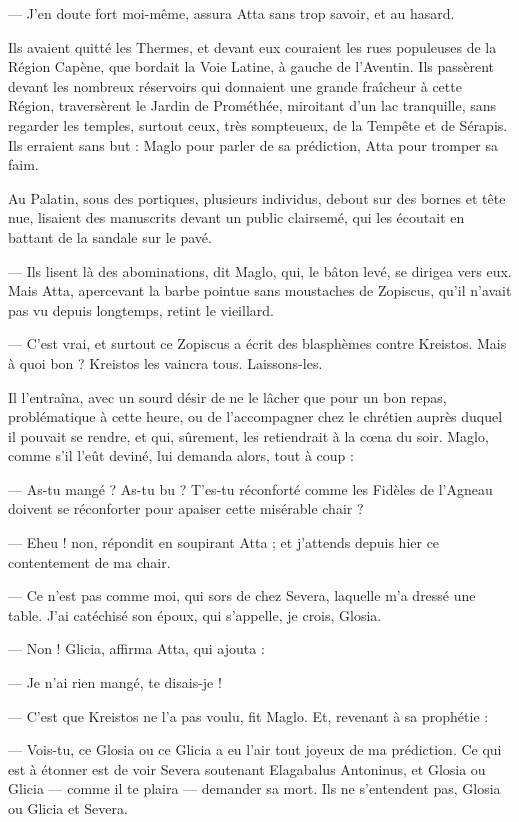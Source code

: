\documentclass[a4paper, 11pt, oneside, polutonikogreek, french]{article}
\begin{document}
--- J'en doute fort moi-même, assura Atta sans trop savoir, et au hasard.

Ils avaient quitté les Thermes, et devant eux couraient les rues populeuses de la Région Capène, que bordait la Voie Latine, à gauche de l'Aventin. Ils passèrent devant les nombreux réservoirs qui donnaient une grande fraîcheur à cette Région, traversèrent le Jardin de Prométhée, miroitant d'un lac tranquille, sans regarder les temples, surtout ceux, très sompteueux, de la Tempête et de Sérapis. Ils erraient sans but : Maglo pour parler de sa prédiction, Atta pour tromper sa faim.

Au Palatin, sous des portiques, plusieurs individus, debout sur des bornes et tête nue, lisaient des manuscrits devant un public clairsemé, qui les écoutait en battant de la sandale sur le pavé.

--- Ils lisent là des abominations, dit Maglo, qui, le bâton levé, se dirigea vers eux. Mais Atta, apercevant la barbe pointue sans moustaches de Zopiscus, qu'il n'avait pas vu depuis longtemps, retint le vieillard.

--- C'est vrai, et surtout ce Zopiscus a écrit des blasphèmes contre Kreistos. Mais à quoi bon ? Kreistos les vaincra tous. Laissons-les.

Il l'entraîna, avec un sourd désir de ne le lâcher que pour un bon repas, problématique à cette heure, ou de l'accompagner chez le chrétien auprès duquel il pouvait se rendre, et qui, sûrement, les retiendrait à la cœna du soir. Maglo, comme s'il l'eût deviné, lui demanda alors, tout à coup :

--- As-tu mangé ? As-tu bu ? T'es-tu réconforté comme les Fidèles de l'Agneau doivent se réconforter pour apaiser cette misérable chair ?

--- Eheu ! non, répondit en soupirant Atta ; et j'attends depuis hier ce contentement de ma chair.

--- Ce n'est pas comme moi, qui sors de chez Severa, laquelle m'a dressé une table. J'ai catéchisé son époux, qui s'appelle, je crois, Glosia.

--- Non ! Glicia, affirma Atta, qui ajouta :

--- Je n'ai rien mangé, te disais-je !

--- C'est que Kreistos ne l'a pas voulu, fit Maglo. Et, revenant à sa prophétie :

--- Vois-tu, ce Glosia ou ce Glicia a eu l'air tout joyeux de ma prédiction. Ce qui est à étonner est de voir Severa soutenant Elagabalus Antoninus, et Glosia ou Glicia --- comme il te plaira --- demander sa mort. Ils ne s'entendent pas, Glosia ou Glicia et Severa.
\end{document}
